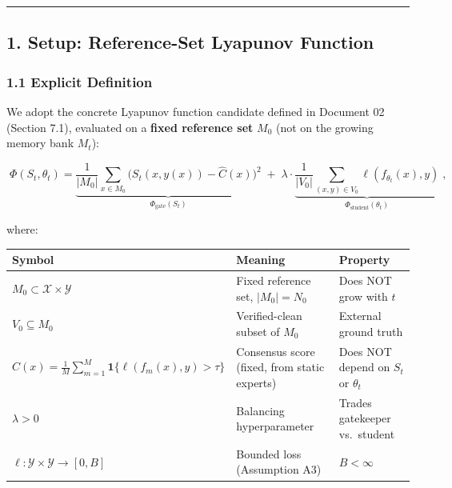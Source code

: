 \documentclass[
  12pt,
]{ctexart}
\begin{document}
\begin{center}\rule{0.5\linewidth}{0.5pt}\end{center}

\subsection{1. Setup: Reference-Set Lyapunov
Function}\label{setup-reference-set-lyapunov-function}

\subsubsection{1.1 Explicit Definition}\label{explicit-definition}

We adopt the concrete Lyapunov function candidate defined in Document 02
(Section 7.1), evaluated on a \textbf{fixed reference set} \(M_0\) (not
on the growing memory bank \(M_t\)):

\[\boxed{\;\Phi(S_t, \theta_t) = \underbrace{\frac{1}{|M_0|} \sum_{x \in M_0} \bigl(S_t(x, y(x)) - \hat{C}(x)\bigr)^2}_{\Phi_{\text{gate}}(S_t)} \;+\; \lambda \cdot \underbrace{\frac{1}{|V_0|} \sum_{(x,y) \in V_0} \ell(f_{\theta_t}(x), y)}_{\Phi_{\text{student}}(\theta_t)}\;},\]

where:

\begin{longtable}[]{@{}
  >{\raggedright\arraybackslash}p{}
  >{\raggedright\arraybackslash}p{}
  >{\raggedright\arraybackslash}p{}@{}}
\toprule\noalign{}
\begin{minipage}[b]{\linewidth}\raggedright
Symbol
\end{minipage} & \begin{minipage}[b]{\linewidth}\raggedright
Meaning
\end{minipage} & \begin{minipage}[b]{\linewidth}\raggedright
Property
\end{minipage} \\
\midrule\noalign{}
\endhead
\bottomrule\noalign{}
\endlastfoot
\(M_0 \subset \mathcal{X} \times \mathcal{Y}\) & Fixed reference set,
\(|M_0| = N_0\) & Does NOT grow with \(t\) \\
\(V_0 \subseteq M_0\) & Verified-clean subset of \(M_0\) & External
ground truth \\
\(\hat{C}(x) = \frac{1}{M}\sum_{m=1}^M \mathbf{1}\{\ell(f_m(x), y) > \tau\}\)
& Consensus score (fixed, from static experts) & Does NOT depend on
\(S_t\) or \(\theta_t\) \\
\(\lambda > 0\) & Balancing hyperparameter & Trades gatekeeper
vs.~student \\
\(\ell: \mathcal{Y} \times \mathcal{Y} \to [0, B]\) & Bounded loss
(Assumption A3) & \(B < \infty\) \\
\end{longtable}
\end{document}
